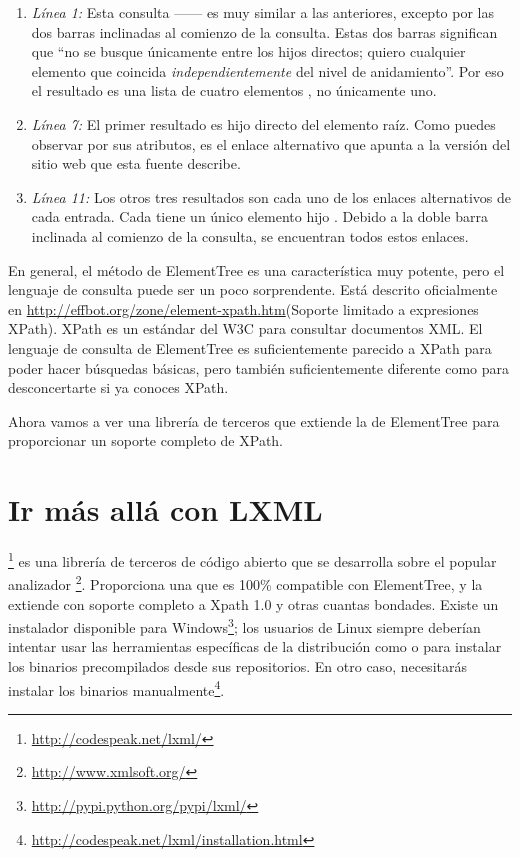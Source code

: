 \begin{enumerate}

\item \emph{Línea 1:} Esta consulta ------ es muy similar a las anteriores, excepto por las dos barras inclinadas al comienzo de la consulta. Estas dos barras significan que ``no se busque únicamente entre los hijos directos; quiero cualquier elemento que coincida \emph{independientemente} del nivel de anidamiento''. Por eso el resultado es una lista de cuatro elementos , no únicamente uno.

\item \emph{Línea 7:} El primer resultado es hijo directo del elemento raíz. Como puedes observar por sus atributos, es el enlace alternativo que apunta a la versión  del sitio web que esta fuente describe.

\item \emph{Línea 11:} Los otros tres resultados son cada uno de los enlaces alternativos de cada entrada. Cada  tiene un único elemento hijo . Debido a la doble barra inclinada al comienzo de la consulta, se encuentran todos estos enlaces.

\end{enumerate}

En general, el método  de ElementTree es una característica muy potente, pero el lenguaje de consulta puede ser un poco sorprendente. Está descrito oficialmente en \href{http://effbot.org/zone/element-xpath.htm}{http://effbot.org/zone/element-xpath.htm}(Soporte limitado a expresiones XPath). XPath es un estándar del W3C para consultar documentos XML. El lenguaje de consulta de ElementTree es suficientemente parecido a XPath para poder hacer búsquedas básicas, pero también suficientemente diferente como para desconcertarte si ya conoces XPath. 

Ahora vamos a ver una librería de terceros que extiende la  de ElementTree para proporcionar un soporte completo de XPath.

\section{Ir más allá con LXML}

\footnote{\href{http://codespeak.net/lxml/}{http://codespeak.net/lxml/}} es una librería de terceros de código abierto que se desarrolla sobre el popular analizador \footnote{\href{http://www.xmlsoft.org/}{http://www.xmlsoft.org/}}. Proporciona una  que es 100\% compatible con ElementTree, y la extiende con soporte completo a Xpath 1.0 y otras cuantas bondades. Existe un instalador disponible para Windows\footnote{\href{http://pypi.python.org/pypi/lxml/}{http://pypi.python.org/pypi/lxml/}}; los usuarios de Linux siempre deberían intentar usar las herramientas específicas de la distribución como  o  para instalar los binarios precompilados desde sus repositorios. En otro caso, necesitarás instalar los binarios manualmente\footnote{\href{http://codespeak.net/lxml/installation.html}{http://codespeak.net/lxml/installation.html}}.

